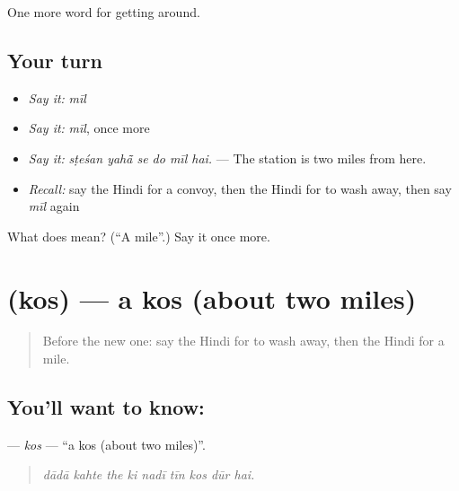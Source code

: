\begin{grammarlens}[title={What you've built}]
One more word for getting around.
\end{grammarlens}

\subsection*{Your turn}
\begin{itemize}
\raggedright
  \item \emph{Say it:} \emph{mīl}
  \item \emph{Say it:} \emph{mīl}, once more
  \item \emph{Say it:} \emph{sṭeśan yahā̃ se do mīl hai.} — The station is two miles from here.
  \item \emph{Recall:} say the Hindi for a convoy, then the Hindi for to wash away, then say \emph{mīl} again
\end{itemize}

\begin{tcolorbox}[breakable,colback=teal!4,colframe=teal!35!black,title={Before you move on}]
What does  mean? (\textquotedblleft{}A mile\textquotedblright{}.) Say it once more.
\end{tcolorbox}
\section[\texorpdfstring{\hi{कोस} (kos)}{कोस (kos)}]{ (kos) — a kos (about two miles)}

\label{lesson:HI-C408-kos}



\begin{quote}
Before the new one: say the Hindi for to wash away, then the Hindi for a mile.
\end{quote}

\subsection*{You'll want to know: }
\textbf{} — \emph{kos} — \textquotedblleft{}a kos (about two miles)\textquotedblright{}.

\begin{quote}
        
\end{quote}

\begin{quote}
\emph{dādā kahte the ki nadī tīn kos dūr hai.}
\end{quote}

